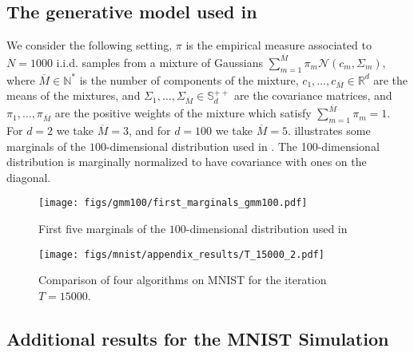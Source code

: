 \subsection{The generative model used in \texorpdfstring{}{Section \ref{sec:synthetic_basic_numerics}}}\label{sec:settings_numerics_GMM}
We consider the following setting, $\pi$ is the empirical measure associated to $N=1000$ i.i.d. samples from a mixture of Gaussians $\sum_{m =1}^{\overline{M}} \pi_{m} \mathcal{N}(c_{m}, \Sigma_{m}) $, where $\overline{M} \in \mathbb{N}^{*}$ is the number of components of the mixture, $c_1, \dots, c_{\overline{M}} \in \mathbb{R}^{d}$ are the means of the mixtures, and $\Sigma_{1}, \dots, \Sigma_{\overline{M}} \in \mathbb{S}^{++}_{d}$ are the covariance matrices, and $\pi_{1}, \dots, \pi_{\overline{M}}$ are the positive weights of the mixture which satisfy $\sum_{m = 1}^{\overline{M}} \pi_{m} =1$. For $d=2$ we take $\overline{M} = 3$, and for $d = 100$ we take $\overline{M} = 5$.  illustrates some marginals of the $100$-dimensional distribution used in . The 100-dimensional distribution is marginally normalized to have covariance with ones on the diagonal.




\begin{figure}[!ht]
    \centering
    \texttt{[image: figs/gmm100/first\_marginals\_gmm100.pdf]}

    \caption{First five marginals of the $100$-dimensional distribution used in }
    \label{fig:gmm_marginals}
\end{figure}







\begin{figure}[!ht]
    \centering
    \texttt{[image: figs/mnist/appendix\_results/T\_15000\_2.pdf]}
    





    

    \caption{Comparison of four algorithms on MNIST for the iteration $T=15000$. }
    \label{fig:mnist_comparison_2}
\end{figure}

\subsection{Additional results for the MNIST Simulation}
